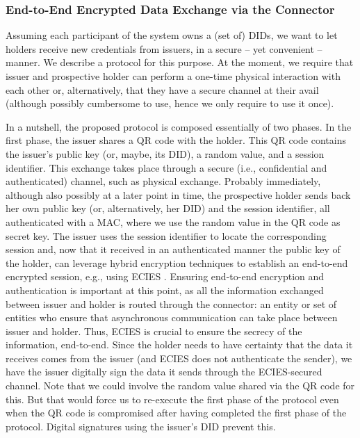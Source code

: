 \documentclass[10pt,a4paper]{article}
\begin{document}
\subsubsection{End-to-End Encrypted Data Exchange via the Connector}
\label{sssec:e2eeconnector}

Assuming each participant of the system owns a (set of) DIDs, we want to let
holders receive new credentials from issuers, in a secure -- yet convenient --
manner. We describe a protocol for this purpose.  At the moment, we require
that issuer and prospective holder can perform a one-time physical interaction
with each other or, alternatively, that they have a secure channel at their
avail (although possibly cumbersome to use, hence we only require to use it
once).

In a nutshell, the proposed protocol is composed essentially of two phases. In
the first phase, the issuer shares a QR code with the holder. This QR code
contains the issuer's public key (or, maybe, its DID), a random value, and a
session identifier. This exchange takes place through a secure (i.e.,
confidential and authenticated) channel, such as physical exchange. Probably
immediately, although also possibly at a later point in time, the prospective
holder sends back her own public key (or, alternatively, her DID) and the
session identifier, all authenticated with a MAC, where we use the random value
in the QR code as secret key. The issuer uses the session identifier to locate
the corresponding session and, now that it received in an authenticated manner
the public key of the holder, can leverage hybrid encryption techniques to
establish an end-to-end encrypted session, e.g., using ECIES \cite{abr01}.
Ensuring end-to-end encryption and authentication is important at this point, as
all the information exchanged between issuer and holder is routed through the
connector: an entity or set of entities who ensure that asynchronous
communication can take place between issuer and holder. Thus, ECIES is crucial
to ensure the secrecy of the information, end-to-end. Since the holder needs to
have certainty that the data it receives comes from the issuer (and ECIES does
not authenticate the sender), we have the issuer digitally sign the data it
sends through the ECIES-secured channel. Note that we could involve the random
value shared via the QR code for this. But that would force us to re-execute the
first phase of the protocol even when the QR code is compromised after having
completed the first phase of the protocol. Digital signatures using the issuer's
DID prevent this.
\end{document}
